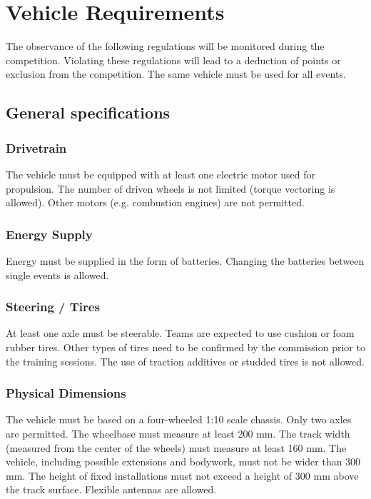 \chapter{Vehicle Requirements}

The observance of the following regulations will be monitored during the competition.
Violating these regulations will lead to a deduction of points or exclusion from the competition.
The same vehicle must be used for all events.

\section{General specifications}

\subsection{Drivetrain}

The vehicle must be equipped with at least one electric motor used for propulsion.
The number of driven wheels is not limited (torque vectoring is allowed).
Other motors (e.g. combustion engines) are not permitted.

\subsection{Energy Supply}

Energy must be supplied in the form of batteries.
Changing the batteries between single events is allowed.

\subsection{Steering / Tires}

At least one axle must be steerable.
Teams are expected to use cushion or foam rubber tires.
Other types of tires need to be confirmed by the commission prior to the training sessions.
The use of traction additives or studded tires is not allowed.

\subsection{Physical Dimensions}

The vehicle must be based on a four-wheeled 1:10 scale chassis.
Only two axles are permitted.
The wheelbase must measure at least 200 mm.
The track width (measured from the center of the wheels) must measure at least 160 mm.
The vehicle, including possible extensions and bodywork, must not be wider than 300 mm.
The height of fixed installations must not exceed a height of 300 mm above the track surface.
Flexible antennas are allowed.

